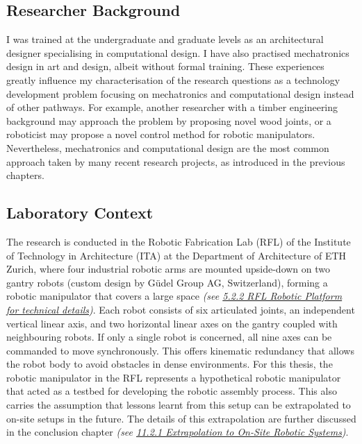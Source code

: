 \subsection{Researcher Background}
\label{subsection:methodology_researcher_background}

I was trained at the undergraduate and graduate levels as an architectural designer specialising in computational design. I have also practised mechatronics design in art and design, albeit without formal training. These experiences greatly influence my characterisation of the research questions as a technology development problem focusing on mechatronics and computational design instead of other pathways. For example, another researcher with a timber engineering background may approach the problem by proposing novel wood joints, or a roboticist may propose a novel control method for robotic manipulators. Nevertheless, mechatronics and computational design are the most common approach taken by many recent research projects, as introduced in the previous chapters.

\subsection{Laboratory Context}
\label{subsection:methodology_laboratory_context}

The research is conducted in the Robotic Fabrication Lab (RFL) of the Institute of Technology in Architecture (ITA) at the Department of Architecture of ETH Zurich, where four industrial robotic arms are mounted upside-down on two gantry robots (custom design by Güdel Group AG, Switzerland), forming a robotic manipulator that covers a large space\textit{ (see \ul{5.2.2 RFL Robotic Platform for technical details})}. Each robot consists of six articulated joints, an independent vertical linear axis, and two horizontal linear axes on the gantry coupled with neighbouring robots. If only a single robot is concerned, all nine axes can be commanded to move synchronously. This offers kinematic redundancy that allows the robot body to avoid obstacles in dense environments. For this thesis, the robotic manipulator in the RFL represents a hypothetical robotic manipulator that acted as a testbed for developing the robotic assembly process. This also carries the assumption that lessons learnt from this setup can be extrapolated to on-site setups in the future. The details of this extrapolation are further discussed in the conclusion chapter \textit{(see \ul{11.2.1 Extrapolation to On-Site Robotic Systems})}. 

